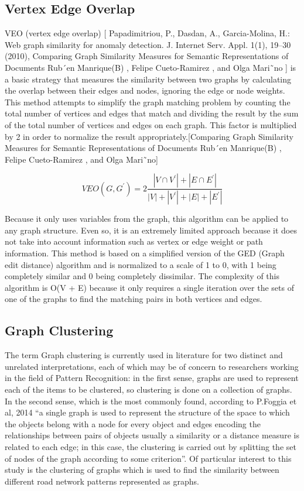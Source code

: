 \subsection{Vertex Edge Overlap}
VEO (vertex edge overlap) [ Papadimitriou, P., Dasdan, A., Garcia-Molina, H.: Web graph similarity for anomaly detection. J. Internet Serv. Appl. 1(1), 19–30 (2010), Comparing Graph Similarity Measures for Semantic Representations of Documents Rub´en Manrique(B) , Felipe Cueto-Ramirez , and Olga Mari˜no ] is a basic strategy that measures the similarity between two graphs by calculating the overlap between their edges and nodes, ignoring the edge or node weights.  This method  attempts to simplify the graph matching problem by counting the total number of vertices and edges that match and dividing the result by the sum of the total number of vertices and edges on each graph. This factor is multiplied by 2 in order to normalize the result appropriately.[Comparing Graph Similarity Measures for Semantic Representations of Documents Rub´en Manrique(B) , Felipe Cueto-Ramirez , and Olga Mari˜no]

\begin{equation}
V E O\left(G, G^{\prime}\right)=2 \frac{\left|V \cap V^{\prime}\right|+\left|E \cap E^{\prime}\right|}{|V|+\left|V^{\prime}\right|+|E|+\left|E^{\prime}\right|}
\end{equation}

Because it only uses variables from the graph, this algorithm can be applied to any graph structure. Even so, it is an extremely limited approach because it does not take into account information such as vertex or edge weight or path information. This method is based on a simplified version of the GED (Graph edit distance) algorithm and is normalized to a scale of 1 to 0, with 1 being completely similar and 0 being completely dissimilar. The complexity of this algorithm is O(V + E) because it only requires a single iteration over the sets of one of the graphs to find the matching pairs in both vertices and edges.


\subsection{Graph Clustering}
The term Graph clustering is currently used in literature for two distinct and unrelated interpretations, each of which may be of concern to researchers working in the field of Pattern Recognition: in the first sense, graphs are used to represent each of the items to be clustered, so clustering is done on a collection of graphs. In the second sense, which is the most commonly found, according to P.Foggia et al, 2014 “a single graph is used to represent the structure of the space to which the objects belong with a node for every object and edges encoding the relationships between pairs of objects usually a similarity or a distance measure is related to each edge; in this case, the clustering is carried out by splitting the set of nodes of the graph according to some criterion”. Of particular interest to this study is the clustering of graphs which is used to find the similarity between different road network patterns represented as graphs.

